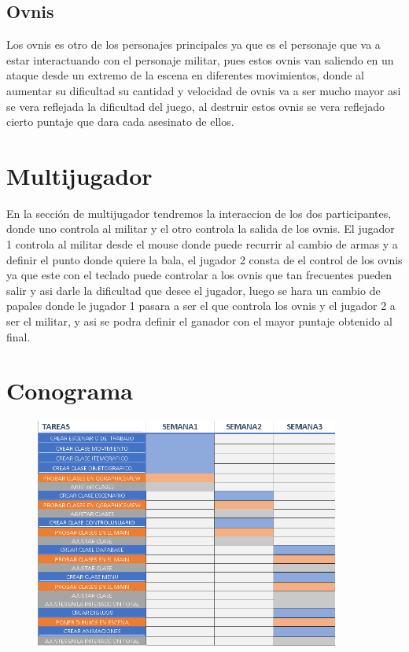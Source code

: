 \documentclass{article}
\begin{document}
\subsection{Ovnis} \label{contenido}
Los ovnis es otro de los personajes principales ya que es el personaje que va a estar interactuando con el personaje militar, pues estos ovnis van saliendo en un ataque desde un extremo de la escena en diferentes movimientos, donde al aumentar su dificultad su cantidad y velocidad de ovnis va a ser mucho mayor asi se vera reflejada la dificultad del juego, al destruir estos ovnis se vera reflejado cierto puntaje que dara cada asesinato de ellos. 

\section{Multijugador} \label{contenido}
En la sección de multijugador tendremos la interaccion de los dos participantes, donde uno controla al militar y el otro controla la salida de los ovnis. El jugador 1 controla al militar desde el mouse donde puede recurrir al cambio de armas y a definir el punto donde quiere la bala, el jugador 2 consta de el control de los ovnis ya que este con el teclado puede controlar a los ovnis que tan frecuentes pueden salir y asi darle la dificultad que desee el jugador, luego se hara un cambio de papales donde le jugador 1 pasara a ser el que controla los ovnis y el jugador 2 a ser el militar, y asi se podra definir el ganador con el mayor puntaje obtenido al final.

\section{Conograma} \label{contenido}

\begin{figure}[htp]
            \centering
            \includegraphics[width=10cm]{images/Cronograma.png}
        \end{figure}
\end{document}
